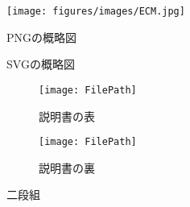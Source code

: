 
\begin{figure}[ht]
    \centering
    \texttt{[image: figures/images/ECM.jpg]}
    \caption{PNGの概略図}
    \label{fig:PNG}
\end{figure}


\begin{figure}[t]
    \centering
    
    \caption{SVGの概略図}
    \label{fig:SVG} 
\end{figure}


\begin{figure}[t]
    \centering
    \begin{subfigure}[ht]{0.45\linewidth}
        \centering
        \texttt{[image: FilePath]}
        \caption{説明書の表}
        \label{fig:manu_f}
    \end{subfigure}
    \hfill
    \begin{subfigure}[ht]{0.45\linewidth}
        \centering
        \texttt{[image: FilePath]}
        \caption{説明書の裏}
        \label{fig:manu_b}
    \end{subfigure}
    \caption{二段組}
    \label{fig:2-COLUMN}
\end{figure}
